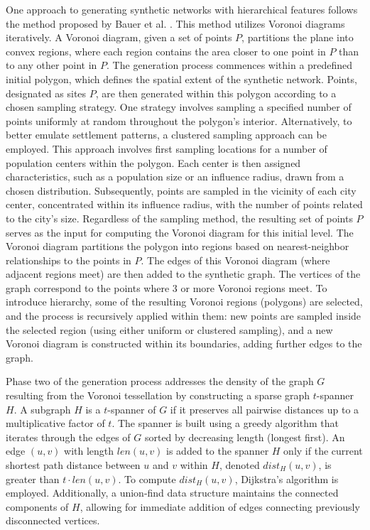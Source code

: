 One approach to generating synthetic networks with hierarchical features follows the method proposed by Bauer et al. \cite{hutchison_synthetic_2010}.
This method utilizes Voronoi diagrams iteratively.
A Voronoi diagram, given a set of points \(P\), partitions the plane into convex regions, where each region contains the area closer to one point in \(P\) than to any other point in \(P\).
The generation process commences within a predefined initial polygon, which defines the spatial extent of the synthetic network.
Points, designated as sites \(P\), are then generated within this polygon according to a chosen sampling strategy.
One strategy involves sampling a specified number of points uniformly at random throughout the polygon's interior.
Alternatively, to better emulate settlement patterns, a clustered sampling approach can be employed.
This approach involves first sampling locations for a number of population centers within the polygon.
Each center is then assigned characteristics, such as a population size or an influence radius, drawn from a chosen distribution.
Subsequently, points are sampled in the vicinity of each city center, concentrated within its influence radius, with the number of points related to the city's size.
Regardless of the sampling method, the resulting set of points \(P\) serves as the input for computing the Voronoi diagram for this initial level.
The Voronoi diagram partitions the polygon into regions based on nearest-neighbor relationships to the points in \(P\).
The edges of this Voronoi diagram (where adjacent regions meet) are then added to the synthetic graph.
The vertices of the graph correspond to the points where 3 or more Voronoi regions meet.
To introduce hierarchy, some of the resulting Voronoi regions (polygons) are selected, and the process is recursively applied within them: new points are sampled inside the selected region (using either uniform or clustered sampling), and a new Voronoi diagram is constructed within its boundaries, adding further edges to the graph.

Phase two of the generation process addresses the density of the graph \(G\) resulting from the Voronoi tessellation by constructing a sparse graph \(t\)-spanner \(H\).
A subgraph \(H\) is a \(t\)-spanner of \(G\) if it preserves all pairwise distances up to a multiplicative factor of \(t\).
The spanner is built using a greedy algorithm that iterates through the edges of \(G\) sorted by decreasing length (longest first).
An edge \((u, v)\) with length \(len(u, v)\) is added to the spanner \(H\) only if the current shortest path distance between \(u\) and \(v\) within \(H\), denoted \(dist_H(u, v)\), is greater than \(t \cdot len(u, v)\).
To compute \(dist_H(u, v)\), Dijkstra's algorithm is employed.
Additionally, a union-find data structure maintains the connected components of \(H\), allowing for immediate addition of edges connecting previously disconnected vertices.

